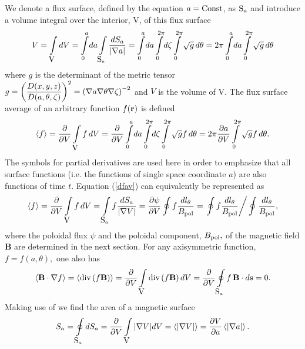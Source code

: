 We denote a flux surface, defined by the equation $a={\rm Const}$, as
$\mbox{\cal S}_a$ and introduce a volume integral over the interior,
{\msym V}, of this flux surface 
\begin{equation}
\label{dfV}
V=\int\limits_{\mbox{\cal V}} dV
=\int\limits_{0}^{a}\! da \int\limits_{\mbox{\cal S}_a}
\frac{dS_a}{|\nabla a|} 
=\int\limits_{0}^{a}\! da \int\limits_{0}^{2\pi}\!
d\zeta\int\limits_{0}^{2\pi}\sqrt{g} \, d\theta 
=2\pi\int\limits_{0}^{a}\! da\int\limits_{0}^{2\pi}\sqrt{g} \, d\theta
\end{equation}
where $g$ is the determinant of the metric tensor 
$g
=\displaystyle\left(\frac{D(x,y,z)}{D(a,\theta,\zeta)}\right)^2
=\left(\nabla a\nabla\theta\nabla\zeta\right)^{-2}
$ and $V$ is the volume of {\msym V}. 
The flux surface average of an arbitrary function $f({\bf r})$ is defined
\begin{equation}
\label{dfav}
\left<f\right>
=\displaystyle{\partial \over\partial V}\int\limits_{\mbox{\cal V}} f\, dV
=\displaystyle{\partial \over\partial V}\int\limits_{0}^{a}\! da \int\limits_{0}^{2\pi}\!
d\zeta\int\limits_{0}^{2\pi}\sqrt{g} f\, d\theta 
=2\pi\displaystyle{\partial a\over\partial V}\int\limits_{0}^{2\pi}\sqrt{g} f\, d\theta
.\end{equation}
The symbols for partial derivatives are used here in order to emphasize
that all surface functions (i.e. the functions of single space
coordinate $a$) are also functions of time $t$.  
Equation (\ref{dfav}) can equivalently be represented as
\begin{equation}
\label{dfav2}
\left<f\right>
=\displaystyle{\partial \over\partial V}\int\limits_{\mbox{\cal V}} f\, dV
=\int\limits_{\mbox{\cal S}_a}f\frac{dS_a}{|\nabla V|}
=\displaystyle{\partial \psi\over\partial V}\oint f\frac{dl_\theta}{B_{\rm pol}}
=\left.\oint f\frac{dl_\theta}{B_{\rm pol}}\right/
\oint \frac{dl_\theta}{B_{\rm pol}}
,\end{equation}
where the poloidal flux $\psi$ and the poloidal component, $B_{\rm
pol},$ of the magnetic field {\bf B} are determined in the next
section. 
For any axisymmetric function, $f=f(a,\theta),$ one also has
\begin{equation}
\label{avBf}
\left<{\bf B}\cdot\nabla f\right>
=\left<\mbox{div}\left(f{\bf B}\right)\right>
=\displaystyle{\partial \over\partial V}\int\limits_{\mbox{\cal V}}\mbox{div}\left(f{\bf B}\right)dV
=\displaystyle{\partial \over\partial V}\oint\limits_{\mbox{\cal S}_a}f\,{\bf B}\cdot d{\bf s}
=0
.\end{equation}
Making use of  we find the area of a magnetic surface
\begin{equation}\label{Sa}
S_a
=\oint\limits_{\mbox{\msym S}_a}dS_a
=\prti{}{V}\int\limits_{\mbox{\msym V}}|\na V|dV
=\av{|\na V|}
=\prti{V}{a}\av{|\na a|}
.\end{equation}
